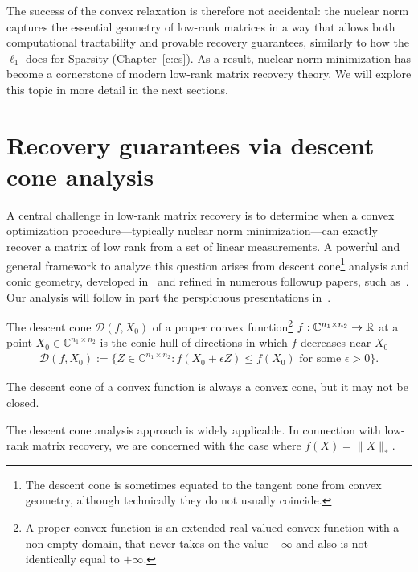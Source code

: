 The success of the convex relaxation is therefore not accidental: the nuclear norm captures the essential geometry of low-rank matrices in a way that allows both computational tractability and provable recovery guarantees, similarly to how the $\ell_1$ does for Sparsity (Chapter~\ref{c:cs}). As a result, nuclear norm minimization has become a cornerstone of modern low-rank matrix recovery theory. We will explore this topic in more detail in the next sections.





\section{Recovery guarantees via descent cone analysis}
\label{s:descentcone}

A central challenge in low-rank matrix recovery is to determine when a convex optimization procedure---typically nuclear norm minimization---can exactly recover a matrix of low rank from a set of linear measurements. A powerful and general framework to analyze this question arises from descent cone\footnote{The descent cone is sometimes equated to the tangent cone from convex geometry, although technically they do not usually coincide.} analysis and conic geometry, developed in~\cite{chandrasekaran2012convex,amelunxen2014living,tropp2015convex}
and refined in numerous followup papers, such as~\cite{kueng2017low,abbasi2019universality,fuchs2022proof}.
Our analysis will follow in part the perspicuous presentations in~\cite{tropp2015convex,fuchs2022proof}.


\begin{definition}\label{def:descentcone}
The descent cone $\mathcal{D}(f,X_0)$ of a proper convex function\footnote{A proper convex function is an extended real-valued convex function with a non-empty domain, that never takes on the value $-\infty$ and also is not identically equal to $+\infty$.} $f: \mathbb{C}^{n_1 \times n_2}\rightarrow \mathbb{R}$ at a point $X_0 \in \mathbb{C}^{n_1 \times n_2}$ is the conic hull of directions in which $f$ decreases near $X_0$ 
\begin{align*}
    \mathcal{D}(f,X_0) :=\{Z\in \mathbb{C}^{n_1 \times n_2}: f(X_0 + \epsilon Z) \le f(X_0) \text{ for some } \epsilon > 0\}.
\end{align*}
\end{definition}
The descent cone of a convex function is always a convex cone, but it may not be closed.

The descent cone analysis approach is widely applicable. In connection with low-rank matrix recovery, we are concerned with the case where $f(X) = \|X\|_*$. 



